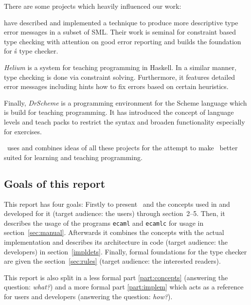 There are some projects which heavily influenced our work:

\citet{haackwells04} have described and implemented a technique 
to produce more descriptive type error messages in a subset of SML.  
Their work is seminal for constraint based type checking with attention 
on good error reporting and builds the foundation for \easyocaml\'s type 
checker.

\emph{Helium} \citep{helium-hw03} is a system for teaching programming 
in Haskell. In a similar manner, type checking is done via constraint 
solving. Furthermore, it features detailed error messages including 
hints how to fix errors based on certain heuristics.

Finally, \emph{DrScheme} \citep{Felleisen98thedrscheme} is a programming 
environment for the Scheme language which is build for teaching 
programming.  It has introduced the concept of language levels and teach 
packs to restrict the syntax and broaden functionality especially for 
exercises.

\easyocaml\ uses and combines ideas of all these projects for the attempt to
make \ocaml\ better suited for learning and teaching programming. \more


\subsection*{Goals of this report}

This report has four goals:
Firstly to present \easyocaml\ and the concepts used in and developed for it
(target audience: the users) through section~2--5.
Then, it describes the usage of the programs \texttt{ecaml} and \texttt{ecamlc}
for usage in section~\ref{sec:manual}.
Afterwards it combines the concepts with the actual implementation and
describes its architecture in code (target audience: the developers) in
section~\ref{impldets}.
Finally, formal foundations for the type checker are given the section~\ref{sec:rules} (target
audience: the interested readers).

This report is also split in a less formal part \ref{part:concepts} (answering
the question: \emph{what?}) and a more formal part \ref{part:implem}
which acts as a reference for users and developers (answering the question:
\emph{how?}).
